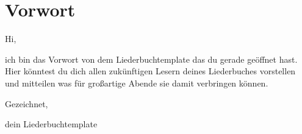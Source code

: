 \documentclass[a5paper,
              12pt,
              pagesize,
              typearea,
              titlepage,
              DIV=10,
              twoside
              ]{scrbook}
\begin{document}
  \pagestyle{empty}
  

    
    \cleardoublepage
    
    \chapter*{Vorwort}
      Hi,

      ich bin das Vorwort von dem Liederbuchtemplate das du gerade geöffnet hast.
      Hier könntest du dich allen zukünftigen Lesern deines Liederbuches vorstellen und mitteilen was für großartige Abende sie damit verbringen können.
      
      Gezeichnet,

      dein Liederbuchtemplate

      \newpage

    \fancyhf{}
    \pagestyle{fancy}
    
    \renewcommand\listfigurename{Ein schnelles Lied!}
    \listoffigures
    \printindex
    
    
    
    
    

    \pagestyle{empty}


    \tableofcontents
    \newpage


    \cleardoublepage
    
    
\end{document}
